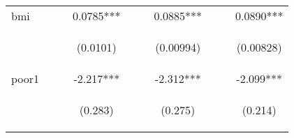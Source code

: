 \documentclass[]{article}
\begin{document}
\begin{center}
\begin{tabular}{lccccccccc}
bmi &  &  & 0.0785*** &  &  & 0.0885*** &  &  & 0.0890*** \\
\vspace{4pt} & \begin{footnotesize}\end{footnotesize} & \begin{footnotesize}\end{footnotesize} & \begin{footnotesize}(0.0101)\end{footnotesize} & \begin{footnotesize}\end{footnotesize} & \begin{footnotesize}\end{footnotesize} & \begin{footnotesize}(0.00994)\end{footnotesize} & \begin{footnotesize}\end{footnotesize} & \begin{footnotesize}\end{footnotesize} & \begin{footnotesize}(0.00828)\end{footnotesize} \\
poor1 &  &  & -2.217*** &  &  & -2.312*** &  &  & -2.099*** \\
\vspace{4pt} & \begin{footnotesize}\end{footnotesize} & \begin{footnotesize}\end{footnotesize} & \begin{footnotesize}(0.283)\end{footnotesize} & \begin{footnotesize}\end{footnotesize} & \begin{footnotesize}\end{footnotesize} & \begin{footnotesize}(0.275)\end{footnotesize} & \begin{footnotesize}\end{footnotesize} & \begin{footnotesize}\end{footnotesize} & \begin{footnotesize}(0.214)\end{footnotesize} \\

\end{tabular}
\end{center}
\end{document}
